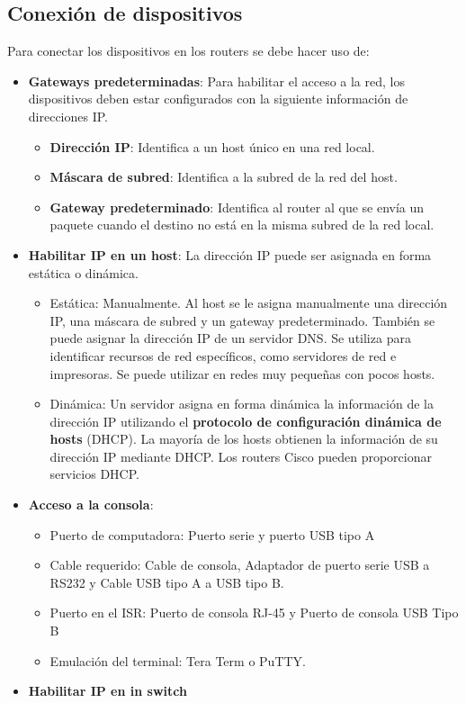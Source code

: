 \documentclass[
	12pt, %
	fleqn, %
	a4paper, %
	oneside, %
]{LegrandOrangeBook}
\begin{document}
\subsection{Conexión de dispositivos}
Para conectar los dispositivos en los routers se debe hacer uso de:
\begin{itemize}
\item \textbf{Gateways predeterminadas}: Para habilitar el acceso a  la red, los dispositivos deben estar configurados con la siguiente información de  direcciones IP.
\begin{itemize}
\item \textbf{Dirección IP}: Identifica a un  host único en una red local.
\item \textbf{Máscara de subred}: Identifica a la subred de la  red del host.
\item \textbf{Gateway predeterminado}: Identifica al router al que se  envía un paquete cuando el  destino no está en la misma  subred de la red local.
\end{itemize}
\item \textbf{Habilitar IP en un host}: La dirección IP puede ser asignada en forma estática o dinámica.
\begin{itemize}
\item Estática: Manualmente. Al host se le asigna  manualmente una dirección IP, una máscara de subred y un gateway  predeterminado. También se puede asignar la dirección IP de un  servidor DNS. Se utiliza para identificar recursos de red específicos, como servidores de red e impresoras. Se puede utilizar en redes muy pequeñas con pocos hosts.
\item Dinámica: Un servidor asigna en forma dinámica la información de la dirección IP utilizando el \textbf{ protocolo de  configuración dinámica de hosts} (DHCP). La mayoría de los hosts obtienen la información de su dirección IP  mediante DHCP. Los routers Cisco pueden proporcionar servicios DHCP.
\end{itemize}
\item \textbf{Acceso a la consola}: 
\begin{itemize}
\item Puerto de computadora: Puerto serie y puerto USB tipo A
\item Cable requerido: Cable de consola, Adaptador de puerto serie USB a RS232 y Cable USB tipo A a USB tipo B.
\item Puerto en el ISR: Puerto de consola RJ-45 y Puerto de consola USB Tipo B
\item Emulación del terminal: Tera Term o PuTTY.
\end{itemize}
\item \textbf{Habilitar IP en in switch}
\end{itemize}
\end{document}
